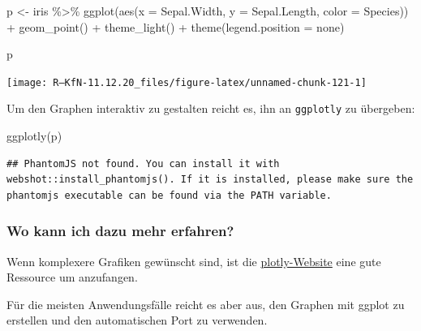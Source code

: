 \documentclass[
]{book}
\newenvironment{Shaded}{\begin{snugshade}}{\end{snugshade}}
\newcommand{\AttributeTok}[1]{\textcolor[rgb]{0.77,0.63,0.00}{#1}}
\newcommand{\FunctionTok}[1]{\textcolor[rgb]{0.00,0.00,0.00}{#1}}
\newcommand{\NormalTok}[1]{#1}
\newcommand{\OtherTok}[1]{\textcolor[rgb]{0.56,0.35,0.01}{#1}}
\newcommand{\SpecialCharTok}[1]{\textcolor[rgb]{0.00,0.00,0.00}{#1}}
\newcommand{\StringTok}[1]{\textcolor[rgb]{0.31,0.60,0.02}{#1}}
\begin{document}
\begin{Shaded}
\begin{Highlighting}[]
\NormalTok{p }\OtherTok{\textless{}{-}}\NormalTok{ iris }\SpecialCharTok{\%\textgreater{}\%} 
  \FunctionTok{ggplot}\NormalTok{(}\FunctionTok{aes}\NormalTok{(}\AttributeTok{x =}\NormalTok{ Sepal.Width,}
             \AttributeTok{y =}\NormalTok{ Sepal.Length,}
             \AttributeTok{color =}\NormalTok{ Species)) }\SpecialCharTok{+}
  \FunctionTok{geom\_point}\NormalTok{() }\SpecialCharTok{+}
  \FunctionTok{theme\_light}\NormalTok{() }\SpecialCharTok{+}
  \FunctionTok{theme}\NormalTok{(}\AttributeTok{legend.position =} \StringTok{\textquotesingle{}none\textquotesingle{}}\NormalTok{)}

\NormalTok{p}
\end{Highlighting}
\end{Shaded}

\begin{center}\texttt{[image: R---KfN-11.12.20\_files/figure-latex/unnamed-chunk-121-1]} \end{center}

Um den Graphen interaktiv zu gestalten reicht es, ihn an \texttt{ggplotly} zu übergeben:

\begin{Shaded}
\begin{Highlighting}[]
\FunctionTok{ggplotly}\NormalTok{(p)}
\end{Highlighting}
\end{Shaded}

\begin{verbatim}
## PhantomJS not found. You can install it with webshot::install_phantomjs(). If it is installed, please make sure the phantomjs executable can be found via the PATH variable.
\end{verbatim}

\hypertarget{htmlwidget-640d7ea4c844e4648163}{}

\hypertarget{wo-kann-ich-dazu-mehr-erfahren-3}{%
\subsubsection{Wo kann ich dazu mehr erfahren?}\label{wo-kann-ich-dazu-mehr-erfahren-3}}

Wenn komplexere Grafiken gewünscht sind, ist die \href{https://plotly.com/r/}{plotly-Website} eine gute Ressource um anzufangen.

Für die meisten Anwendungsfälle reicht es aber aus, den Graphen mit ggplot zu erstellen und den automatischen Port zu verwenden.
\end{document}
